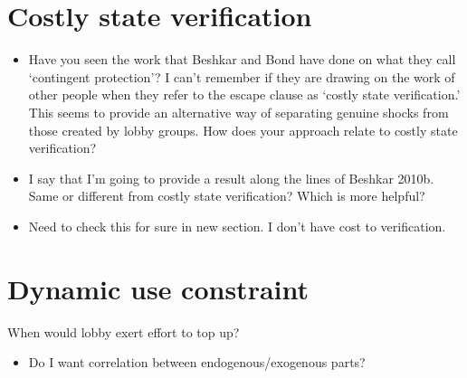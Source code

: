 \documentclass[12pt]{article}
\begin{document}
\section{Costly state verification}
		\begin{itemize}
				\item Have you seen the work that Beshkar and Bond have done on what they call `contingent protection'?  I can't remember if they are drawing on the work of other people when they refer to the escape clause as `costly state verification.'  This seems to provide an alternative way of separating genuine shocks from those created by lobby groups.  How does your approach relate to costly state verification?
				\item I say that I'm going to provide a result along the lines of Beshkar 2010b. Same or different from costly state verification? Which is more helpful?
				\item Need to check this for sure in new section. I don't have cost to verification.
		\end{itemize}


\section{Dynamic use constraint}
When would lobby exert effort to top up?
\begin{itemize}
	\item Do I want correlation between endogenous/exogenous parts? 
\end{itemize}
\end{document}
